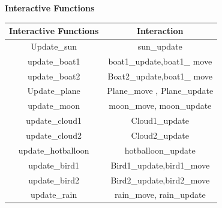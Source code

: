 \documentclass{article}
\begin{document}
\begin{center}
  \begin{code}
\textbf{Interactive Functions}

\end{code}  
\end{center}
\begin{center}
\begin{tabular}{c|c}
    \hline
   \textbf{Interactive Functions}  & \textbf{Interaction} \\
    \hline
    Update_sun & sun_update \\
    \hline
    update_boat1	& boat1_update,boat1_ move\\
    \hline
    update_boat2	& Boat2_update,boat1_ move\\
    \hline
    Update_plane	& Plane_move , Plane_update\\
    \hline
     update_moon	&  moon_move, moon_update\\
     \hline
    update_cloud1 &	Cloud1_update\\
    \hline
    update_cloud2	& Cloud2_update\\
    \hline
    update_hotballoon	 & hotballoon_update\\
    \hline
    update_bird1	& Bird1_update,bird1_move\\
    \hline
    update_bird2	& Bird2_update,bird2_move\\
    \hline
    update_rain	& rain_move, rain_update\\
    
    
\end{tabular}
\\
\end{center}
\begin{center}
    \\
\end{center}
\begin{center}
    \\
\end{center}
\end{document}
